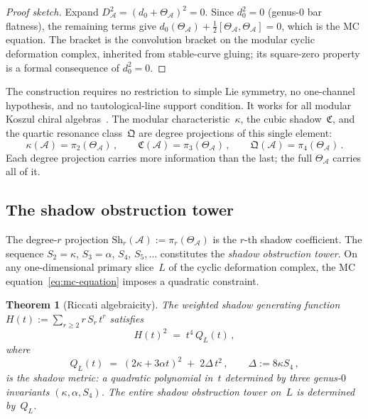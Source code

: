 \documentclass[11pt,reqno]{amsart}
\newtheorem{theorem}{Theorem}[section]
\theoremstyle{definition}
\theoremstyle{remark}
\newcommand{\cA}{\mathcal{A}}
\numberwithin{equation}{section}
\begin{document}
\begin{proof}[Proof sketch]
Expand $D_\cA^2 = (d_0 + \Theta_\cA)^2 = 0$.
Since $d_0^2 = 0$ (genus-$0$ bar flatness), the
remaining terms give
$d_0(\Theta_\cA) + \frac{1}{2}[\Theta_\cA, \Theta_\cA]
= 0$, which is the MC equation. The bracket is the
convolution bracket on the modular cyclic deformation
complex, inherited from stable-curve gluing; its square-zero
property is a formal consequence of $d_0^2 = 0$.
\end{proof}

The construction requires no restriction to simple Lie
symmetry, no one-channel hypothesis, and no tautological-line
support condition. It works for all modular Koszul chiral
algebras~\cite{MS24}. The modular characteristic~$\kappa$, the cubic
shadow~$\mathfrak{C}$, and the quartic resonance
class~$\mathfrak{Q}$ are degree projections of this single
element:
\begin{equation}\label{eq:shadow-projections}
\kappa(\cA) = \pi_2(\Theta_\cA)\,,
\qquad
\mathfrak{C}(\cA) = \pi_3(\Theta_\cA)\,,
\qquad
\mathfrak{Q}(\cA) = \pi_4(\Theta_\cA)\,.
\end{equation}
Each degree projection carries more information than the
last; the full $\Theta_\cA$ carries all of it.

\subsection{The shadow obstruction tower}
\label{ssec:shadow-tower}

The degree-$r$ projection
$\mathrm{Sh}_r(\cA) := \pi_r(\Theta_\cA)$ is the $r$-th
shadow coefficient. The sequence $S_2 = \kappa$,
$S_3 = \alpha$, $S_4$, $S_5, \ldots$ constitutes the
\emph{shadow obstruction tower}. On any one-dimensional
primary slice~$L$ of the cyclic deformation complex, the
MC equation~\eqref{eq:mc-equation} imposes a quadratic
constraint.

\begin{theorem}[Riccati algebraicity]
\label{thm:riccati}
The weighted shadow generating function
$H(t) := \sum_{r \ge 2} r\,S_r\,t^r$
satisfies
\begin{equation}\label{eq:algebraic-relation}
H(t)^2 \;=\; t^4\,Q_L(t)\,,
\end{equation}
where
\begin{equation}\label{eq:shadow-metric}
Q_L(t)
\;=\;
(2\kappa + 3\alpha t)^2
\;+\;
2\Delta\,t^2\,,
\qquad
\Delta := 8\kappa S_4\,,
\end{equation}
is the \emph{shadow metric}: a quadratic polynomial in~$t$
determined by three genus-$0$ invariants
$(\kappa, \alpha, S_4)$.
The entire shadow obstruction tower on~$L$ is determined
by~$Q_L$.
\end{theorem}
\end{document}
